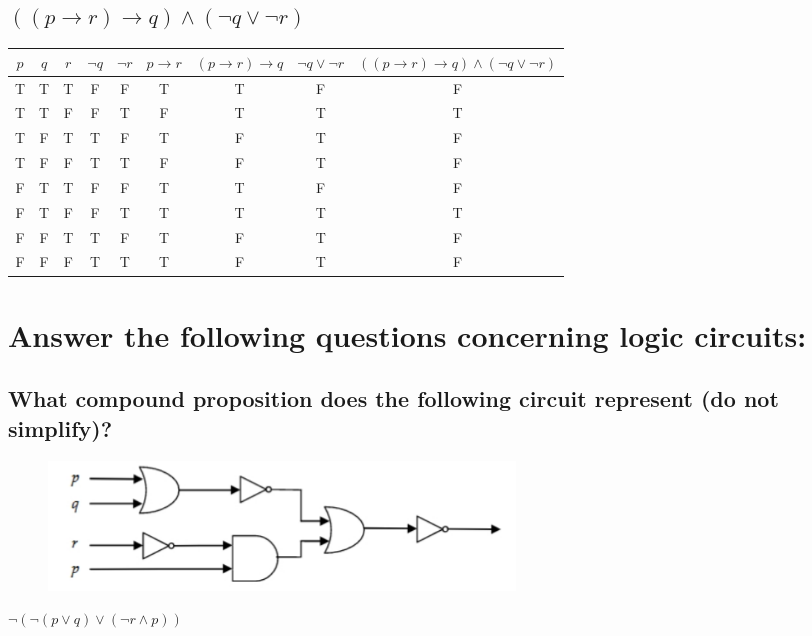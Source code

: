 \documentclass{article}
\begin{document}
    \subsection{\texorpdfstring{$((p \to r) \to q) \wedge (\neg q \vee \neg r)$}{((p → r) → q) ∧ (¬q ∨ ¬r)}} 
        \begin{center}
            \begin{tabular}{|c|c|c|c|c|c|c|c|c|}
                \hline
                $p$ & $q$ & $r$ & $\neg q$ & $\neg r$ & $p \to r$ & $(p \to r) \to q$ & $\neg q \vee \neg r$ & $((p \to r) \to q) \wedge (\neg q \vee \neg r)$ \\
                \hline
                T & T & T & F & F & T & T & F & F \\
                T & T & F & F & T & F & T & T & T \\
                T & F & T & T & F & T & F & T & F \\  
                T & F & F & T & T & F & F & T & F \\
                F & T & T & F & F & T & T & F & F \\
                F & T & F & F & T & T & T & T & T \\
                F & F & T & T & F & T & F & T & F \\
                F & F & F & T & T & T & F & T & F \\
                \hline
            \end{tabular}
        \end{center}

\section{Answer the following questions concerning logic circuits:}
    \subsection{What compound proposition does the following circuit represent (do not simplify)?} 
        \begin{figure}[h]
            \centering
            \includegraphics[width=0.6\textwidth]{logic-circuit.png}
        \end{figure}
    \texorpdfstring{$\neg(\neg(p\vee q) \vee (\neg r \wedge p))$}{¬(p ∨ q) ∨ (¬r ∧ p) }
\end{document}
